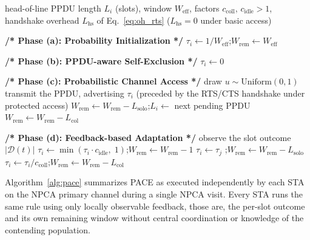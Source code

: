 \documentclass[conference]{IEEEtran}
\newcommand{\PHASE}[1]{\item[]{\normalfont\bfseries #1}}
\begin{document}
\begin{algorithm}[t]
\caption{PACE at STA $i$ during one NPCA visit}
\label{alg:pace}
\begin{algorithmic}[1]
\REQUIRE head-of-line PPDU length $L_i$ (slots), window $W_\mathrm{eff}$, factors $c_\mathrm{coll},\,c_\mathrm{idle}>1$, handshake overhead $L_\mathrm{hs}$ of Eq.~\eqref{eq:oh_rts} ($L_\mathrm{hs}=0$ under basic access)
\PHASE {/* Phase (a): Probability Initialization */}
\STATE $\tau_i \leftarrow 1/W_\mathrm{eff}$;\quad $W_\mathrm{rem} \leftarrow W_\mathrm{eff}$
    \PHASE {/* Phase (b): PPDU-aware Self-Exclusion */}
        \STATE $\tau_i \leftarrow 0$
    \ENDIF
    \PHASE {/* Phase (c): Probabilistic Channel Access */}
    \STATE draw $u \sim \mathrm{Uniform}(0,1)$
        \STATE transmit the PPDU, advertising $\tau_i$ (preceded by the RTS/CTS handshake under protected access)
            \STATE $W_\mathrm{rem} \leftarrow W_\mathrm{rem} - L_\mathrm{solo}$;\quad $L_i \leftarrow$ next pending PPDU
        \ELSE
            \STATE $W_\mathrm{rem} \leftarrow W_\mathrm{rem} - L_\mathrm{col}$ 
        \ENDIF
    \ELSE
        \PHASE {/* Phase (d): Feedback-based Adaptation */}
        \STATE observe the slot outcome $|\mathcal{D}(t)|$
            \STATE $\tau_i \leftarrow \min(\tau_i \cdot c_\mathrm{idle},\;1)$;\quad $W_\mathrm{rem} \leftarrow W_\mathrm{rem} - 1$
            \STATE $\tau_i \leftarrow \tau_j$ ;\quad $W_\mathrm{rem} \leftarrow W_\mathrm{rem} - L_\mathrm{solo}$
        \ELSE
            \STATE $\tau_i \leftarrow \tau_i / c_\mathrm{coll}$;\quad $W_\mathrm{rem} \leftarrow W_\mathrm{rem} - L_\mathrm{col}$
        \ENDIF
    \ENDIF
\ENDWHILE
\end{algorithmic}
\end{algorithm}

Algorithm~\ref{alg:pace} summarizes PACE as executed independently by each STA on the NPCA primary channel during a single NPCA visit. Every STA runs the same rule using only locally observable feedback, those are, the per-slot outcome and its own remaining window without central coordination or knowledge of the contending population.

\end{document}
